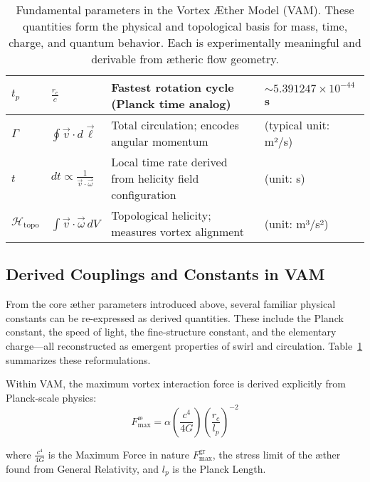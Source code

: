 \begin{table}[H]
\begin{tabular}{|l|l|l|l|}
        $t_p$ &
        $\frac{r_c}{c}$ &
        Fastest rotation cycle (Planck time analog) &
        $\sim 5.391247 \times 10^{-44}$ s \\
        \hline

        $\Gamma$ &
        $\oint \vec{v} \cdot d\vec{\ell}$ &
        Total circulation; encodes angular momentum &
        (typical unit: m²/s) \\
        \hline

        $t$ &
        $dt \propto \frac{1}{\vec{v} \cdot \vec{\omega}}$ &
        Local time rate derived from helicity field configuration &
        (unit: s) \\
        \hline

        $\mathcal{H}_\text{topo}$ &
        $\int \vec{v} \cdot \vec{\omega} \, dV$ &
        Topological helicity; measures vortex alignment &
        (unit: m³/s²) \\
        \hline
    \end{tabular}
    \caption{Fundamental parameters in the Vortex Æther Model (VAM). These quantities form the physical and topological basis for mass, time, charge, and quantum behavior. Each is experimentally meaningful and derivable from ætheric flow geometry.}
    \label{tab:VAM_master_table}
\end{table}


\subsection*{Derived Couplings and Constants in VAM}
From the core æther parameters introduced above, several familiar physical constants can be re-expressed as derived quantities. These include the Planck constant, the speed of light, the fine-structure constant, and the elementary charge—all reconstructed as emergent properties of swirl and circulation. Table~\ref{tab:VAM_master_table} summarizes these reformulations.

Within VAM, the maximum vortex interaction force is derived explicitly from Planck-scale physics:
\begin{equation}
    F^{\text{\ae}}_{\text{max}} = \alpha \left(\frac{c^4}{4G}\right)  \left(\frac{r_c}{l_p}\right)^{-2}\label{eq:FmaxVAMfromGR}
\end{equation}

where $\frac{c^4}{4G}$ is the Maximum Force in nature $F^{\text{gr}}_\text{max}$, the stress limit of the æther found from General Relativity, and $l_p$ is the Planck Length.



